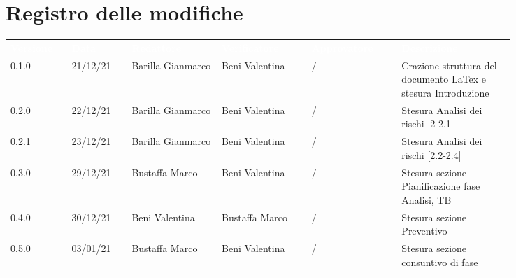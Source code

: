 \section*{Registro delle modifiche}

{\renewcommand{\arraystretch}{1.5}
\scriptsize
\begin{tabular}{p{0.10\linewidth}p{0.10\linewidth}p{0.15\linewidth}p{0.15\linewidth}p{0.15\linewidth}p{0.19\linewidth}}
	\rowcolor[RGB]{33, 73, 50}
	\textcolor{white}{\textbf{Versione}} & \textcolor{white}{\textbf{Data}} &
	\textcolor{white}{\textbf{Redattore}} & \textcolor{white}{\textbf{Verificatore}} &
	\textcolor{white}{\textbf{Approvatore}} & \textcolor{white}{\textbf{Descrizione}}\\
	\rowcolor[RGB]{216, 235, 171}
	0.1.0 & 21/12/21 & Barilla Gianmarco & Beni Valentina & / & Crazione struttura del documento LaTex e stesura Introduzione\\
	\rowcolor[RGB]{233, 245, 206}
	0.2.0 & 22/12/21 & Barilla Gianmarco & Beni Valentina & / & Stesura Analisi dei rischi [2-2.1]\\
	\rowcolor[RGB]{216, 235, 171}
	0.2.1 & 23/12/21 & Barilla Gianmarco& Beni Valentina & / & Stesura Analisi dei rischi [2.2-2.4]\\
	\rowcolor[RGB]{233, 245, 206}
	0.3.0 & 29/12/21 & Bustaffa Marco& Beni Valentina & / & Stesura sezione Pianificazione fase Analisi, TB\\
	\rowcolor[RGB]{216, 235, 171}
	0.4.0 & 30/12/21 & Beni Valentina& Bustaffa Marco & / & Stesura sezione Preventivo\\
	\rowcolor[RGB]{233, 245, 206}
	0.5.0 & 03/01/21 & Bustaffa Marco& Beni Valentina & / & Stesura sezione consuntivo di fase\\
\end{tabular}	
}